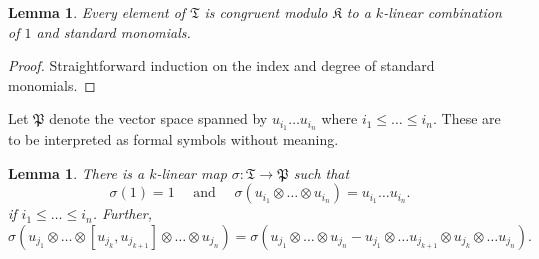 \documentclass[12pt]{article}
\theoremstyle{thmstyle}
\newtheorem{lemma}[theorem]{Lemma}
\theoremstyle{defstyle}
\newcommand{\frakT}{\mathfrak{T}}
\newcommand{\frakK}{\mathfrak{K}}
\newcommand{\frakP}{\mathfrak{P}} %
\renewcommand{\le}{\leqslant}
\begin{document}
\begin{lemma}
    Every element of $\frakT$ is congruent modulo $\frakK$ to a $k$-linear combination of $1$ and standard monomials.
\end{lemma}
\begin{proof}
    Straightforward induction on the index and degree of standard monomials.
\end{proof}

Let $\frakP$ denote the vector space spanned by $u_{i_1}\dots u_{i_n}$ where $i_1\le \dots \le i_n$. These are to be interpreted as formal symbols without meaning.

\begin{lemma}
    There is a $k$-linear map $\sigma:\frakT\to\frakP$ such that 
    \begin{equation*}
        \sigma(1) = 1\quad\text{ and }\quad\sigma(u_{i_1}\otimes\dots\otimes u_{i_n}) = u_{i_1}\dots u_{i_n}.
    \end{equation*}
    if $i_1\le \dots \le i_n$. Further, 
    \begin{equation*}
        \sigma(u_{j_1}\otimes\dots\otimes[u_{j_k}, u_{j_{k + 1}}]\otimes\dots\otimes u_{j_n}) = \sigma(u_{j_1}\otimes\dots\otimes u_{j_n} - u_{j_1}\otimes\dots u_{j_{k + 1}}\otimes u_{j_k}\otimes\dots u_{j_n}).
    \end{equation*}
\end{lemma}
\end{document}
